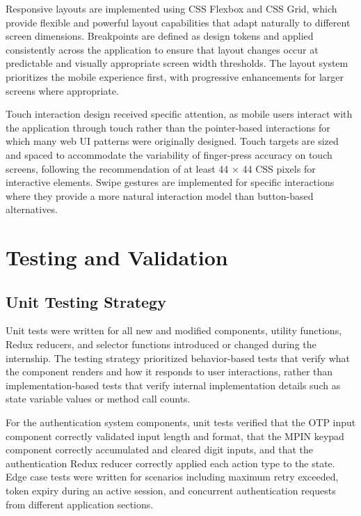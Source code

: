 Responsive layouts are implemented using CSS Flexbox and CSS Grid, which provide flexible and powerful layout capabilities that adapt naturally to different screen dimensions. Breakpoints are defined as design tokens and applied consistently across the application to ensure that layout changes occur at predictable and visually appropriate screen width thresholds. The layout system prioritizes the mobile experience first, with progressive enhancements for larger screens where appropriate.

Touch interaction design received specific attention, as mobile users interact with the application through touch rather than the pointer-based interactions for which many web UI patterns were originally designed. Touch targets are sized and spaced to accommodate the variability of finger-press accuracy on touch screens, following the recommendation of at least 44 × 44 CSS pixels for interactive elements. Swipe gestures are implemented for specific interactions where they provide a more natural interaction model than button-based alternatives.

\section{Testing and Validation}

\subsection{Unit Testing Strategy}

Unit tests were written for all new and modified components, utility functions, Redux reducers, and selector functions introduced or changed during the internship. The testing strategy prioritized behavior-based tests that verify what the component renders and how it responds to user interactions, rather than implementation-based tests that verify internal implementation details such as state variable values or method call counts.

For the authentication system components, unit tests verified that the OTP input component correctly validated input length and format, that the MPIN keypad component correctly accumulated and cleared digit inputs, and that the authentication Redux reducer correctly applied each action type to the state. Edge case tests were written for scenarios including maximum retry exceeded, token expiry during an active session, and concurrent authentication requests from different application sections.

